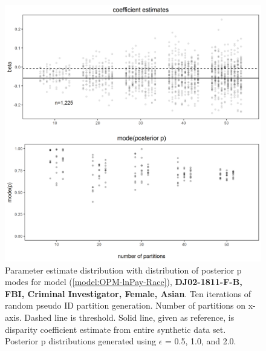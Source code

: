 \documentclass[10pt, letterpaper]{article}
\begin{document}
\begin{spacing}{1.0}
\begin{figure}[]
    \centering
    \includegraphics[width=6in]{images/RacePayDifferentialBetaWithPosteriorDistribution-DJ02-1811-F-B.png}
    \caption{Parameter estimate distribution with distribution of posterior p modes for model (\ref{model:OPM-lnPay-Race}), \textbf{DJ02-1811-F-B, FBI, Criminal Investigator, Female, Asian}.  Ten iterations of random pseudo ID partition generation.  Number of partitions on x-axis.  Dashed line is threshold.  Solid line, given as reference, is disparity coefficient estimate from entire synthetic data set.  Posterior p distributions generated using $\epsilon$ = 0.5, 1.0, and 2.0.}
    \label{figure:RacePayDifferentialBetaWithPosteriorDistribution-DJ02-1811-F-B}
\end{figure}

\clearpage


\end{spacing}
\end{document}
